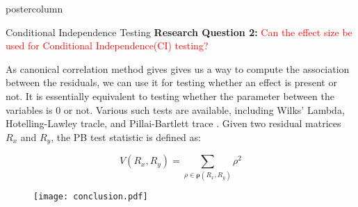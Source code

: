 \documentclass{beamer}
\newlength{\columnheight}
\begin{document}
\begin{frame}
\begin{columns}
	\begin{column}{0.33\textwidth}
		\begin{beamercolorbox}[center]{postercolumn}
			\begin{minipage}{.98\textwidth} %
				\parbox[t][\columnheight]{\textwidth}{ %
	\begin{myblock}{Conditional Independence Testing}
		\textbf{Research Question 2:} \textcolor{red}{Can the effect size be used for Conditional Independence(CI) testing?}

		As canonical correlation method gives gives us a way to compute the association between the residuals, we can use it for testing whether 
		an effect is present or not. It is essentially equivalent to testing whether the parameter between the variables is $ 0 $ or not. Various
		such tests are available, including Wilks' Lambda, Hotelling-Lawley tracle, and Pillai-Bartlett trace \citep{}. Given two residual 
		matrices $ R_x $ and $ R_y $, the PB test statistic is defined as:

		\begin{equation*}
			V(R_x, R_y) = \sum_{\rho \in \bm{\rho}(R_x, R_y)} \rho^2
		\end{equation*}

		\begin{figure}
			\texttt{[image: conclusion.pdf]}
		\end{figure}


\end{myblock}}
\end{minipage}
\end{beamercolorbox}
\end{column}
\end{columns}
\end{frame}
\end{document}
